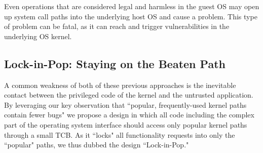 Even operations that are considered
legal and harmless in the guest OS may open up system call paths into the underlying
host OS and cause a problem.
This type of problem can be fatal, 
as it can reach and trigger vulnerabilities in the underlying OS kernel.

\subsection{Lock-in-Pop: Staying on the Beaten Path }
A common weakness of both of these previous approaches is the inevitable contact
between the privileged code of the kernel and the untrusted application. 
By leveraging our key observation 
that ``popular, frequently-used kernel paths contain fewer bugs" we propose a design
in which all code including the complex part
of the operating system interface should access only
popular kernel paths through a small TCB. As it ``locks" all functionality 
requests into only the ``popular" paths, we thus dubbed the
design ``Lock-in-Pop."


